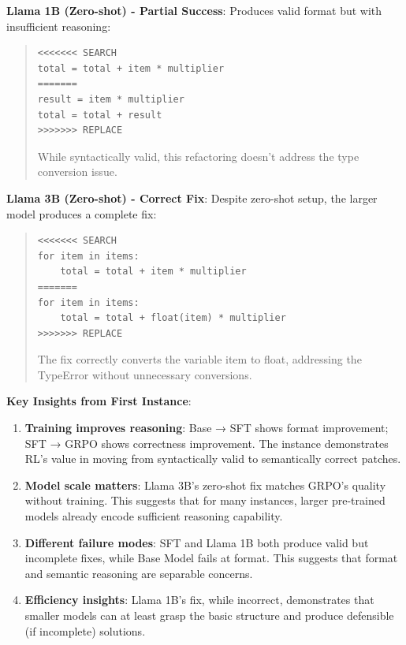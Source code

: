 \documentclass{article} %
\begin{document}
\textbf{Llama 1B (Zero-shot) - Partial Success}:
Produces valid format but with insufficient reasoning:
\begin{quote}
\small
\begin{verbatim}
<<<<<<< SEARCH
total = total + item * multiplier
=======
result = item * multiplier
total = total + result
>>>>>>> REPLACE
\end{verbatim}

While syntactically valid, this refactoring doesn't address the type conversion issue.
\end{quote}

\textbf{Llama 3B (Zero-shot) - Correct Fix}:
Despite zero-shot setup, the larger model produces a complete fix:
\begin{quote}
\small
\begin{verbatim}
<<<<<<< SEARCH
for item in items:
    total = total + item * multiplier
=======
for item in items:
    total = total + float(item) * multiplier
>>>>>>> REPLACE
\end{verbatim}

The fix correctly converts the variable item to float, addressing the TypeError without unnecessary conversions.
\end{quote}

\textbf{Key Insights from First Instance}:

\begin{enumerate}
    \item \textbf{Training improves reasoning}: Base → SFT shows format improvement; SFT → GRPO shows correctness improvement. The instance demonstrates RL's value in moving from syntactically valid to semantically correct patches.

    \item \textbf{Model scale matters}: Llama 3B's zero-shot fix matches GRPO's quality without training. This suggests that for many instances, larger pre-trained models already encode sufficient reasoning capability.

    \item \textbf{Different failure modes}: SFT and Llama 1B both produce valid but incomplete fixes, while Base Model fails at format. This suggests that format and semantic reasoning are separable concerns.

    \item \textbf{Efficiency insights}: Llama 1B's fix, while incorrect, demonstrates that smaller models can at least grasp the basic structure and produce defensible (if incomplete) solutions.
\end{enumerate}
\end{document}
